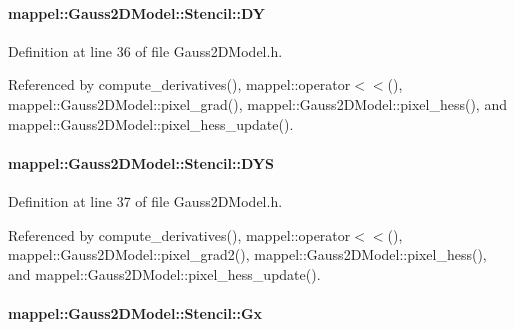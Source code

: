 \paragraph[{\texorpdfstring{DY}{DY}}]{ mappel\+::\+Gauss2\+D\+Model\+::\+Stencil\+::\+DY}\hypertarget{classmappel_1_1Gauss2DModel_1_1Stencil_a840082243683a1c1f111c7473913da4e}{}\label{classmappel_1_1Gauss2DModel_1_1Stencil_a840082243683a1c1f111c7473913da4e}


Definition at line 36 of file Gauss2\+D\+Model.\+h.



Referenced by compute\+\_\+derivatives(), mappel\+::operator$<$$<$(), mappel\+::\+Gauss2\+D\+Model\+::pixel\+\_\+grad(), mappel\+::\+Gauss2\+D\+Model\+::pixel\+\_\+hess(), and mappel\+::\+Gauss2\+D\+Model\+::pixel\+\_\+hess\+\_\+update().

\paragraph[{\texorpdfstring{D\+YS}{DYS}}]{ mappel\+::\+Gauss2\+D\+Model\+::\+Stencil\+::\+D\+YS}\hypertarget{classmappel_1_1Gauss2DModel_1_1Stencil_a96444ae896e044524a7ffd81a8d7ab80}{}\label{classmappel_1_1Gauss2DModel_1_1Stencil_a96444ae896e044524a7ffd81a8d7ab80}


Definition at line 37 of file Gauss2\+D\+Model.\+h.



Referenced by compute\+\_\+derivatives(), mappel\+::operator$<$$<$(), mappel\+::\+Gauss2\+D\+Model\+::pixel\+\_\+grad2(), mappel\+::\+Gauss2\+D\+Model\+::pixel\+\_\+hess(), and mappel\+::\+Gauss2\+D\+Model\+::pixel\+\_\+hess\+\_\+update().

\paragraph[{\texorpdfstring{Gx}{Gx}}]{ mappel\+::\+Gauss2\+D\+Model\+::\+Stencil\+::\+Gx}\hypertarget{classmappel_1_1Gauss2DModel_1_1Stencil_a5fa2dbc0d5f95d6e2df63984927b3932}{}\label{classmappel_1_1Gauss2DModel_1_1Stencil_a5fa2dbc0d5f95d6e2df63984927b3932}


